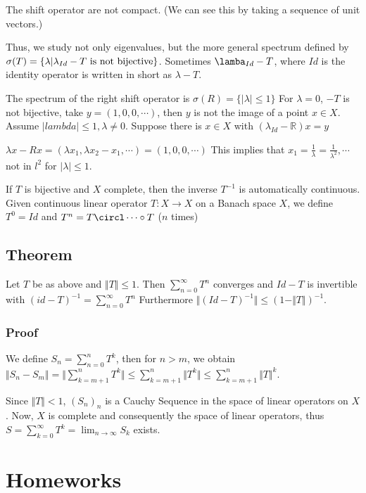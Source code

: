 \documentclass[11pt]{article}
\def\R{\mathbb{R}}
\begin{document}
The shift operator are not compact. (We can see this by taking a sequence of
unit vectors.)

Thus, we study not only eigenvalues, but the more general spectrum defined by
\(\sigma (T) = \{ \lambda \vert \lambda_{Id} - T \textup{ is not
   bijective}\}\). Sometimes \(\lamba_{Id} - T\), where \(Id\) is the identity
operator is written in short as \(\lambda - T\).

The spectrum of the right shift operator is \(\sigma(R) = \{\vert \lambda
   \vert \le 1\}\) For \(\lambda = 0\), \(-T\) is not bijective, take \(y = (1, 0, 0,
   \cdots)\), then \(y\) is not the image of a point \(x \in X\). Assume \(\vert
   lambda \vert \le 1, \lambda \neq 0\). Suppose there is \(x \in X\) with
\((\lambda_{Id} - \R)x = y\)

\(\lambda x - Rx = (\lambda x_1, \lambda x_2 - x_1, \cdots) = (1, 0, 0,
   \cdots)\) This implies that \(x_1 = \frac1\lambda = \frac{1}{\lambda^2},
   \cdots\) not in \(l^2\) for \(\vert \lambda \vert \le 1\).

If \(T\) is bijective and \(X\) complete, then the inverse \(T^{-1}\) is
automatically continuous. Given continuous linear operator \(T \colon X
   \rightarrow X\) on a Banach space \(X\), we define \(T^{0} = Id\) and \(T^n = T
   \circl \cdots \circ T\) (\(n\) times)
\subsection{Theorem}
\label{sec:org15d4bae}
Let \(T\) be as above and \(\Vert T \Vert \le 1\). Then \(\sum_{n=0}^{\infty} T^n\)
converges and \(Id - T\) is invertible with \((id - T)^{-1} =
   \sum_{n=0}^{\infty} T^n\) Furthermore \(\Vert (Id - T)^{-1}\Vert \le (1 - \Vert
   T \Vert)^{-1}\).
\subsubsection{Proof}
\label{sec:org195d21e}
We define \(S_n = \sum_{n = 0}^{n} T^k\), then for \(n > m\), we obtain \(\Vert
    S_n - S_m \Vert = \Vert \sum_{k = m+1}^{n} T^k\Vert \le \sum_{k = m+1}^{n}
    \Vert T^k\Vert \le \sum_{k=m+1}^{n} \Vert T \Vert^k\).

Since \(\Vert T \Vert < 1\), \((S_n)_n\) is a Cauchy Sequence in the space of
linear operators on \(X\). Now, \(X\) is complete and consequently the space of
linear operators, thus \(S = \sum_{k=0}^{\infty} T^k =\lim_{n \rightarrow
    \infty} S_k\) exists.
\section{Homeworks}
\label{sec:org6f1f1b0}
\end{document}
